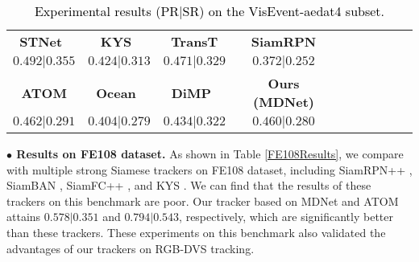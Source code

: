 \documentclass[journal]{IEEEtran}
\begin{document}
\begin{table}[!htp]
\center
\scriptsize      
\caption{\textcolor{black}{Experimental results (PR$|$SR) on the VisEvent-aedat4 subset.}} 
\label{VisEventaedat4Results} 
\begin{tabular}{cccccccccc} 	 
\hline \toprule [0.5 pt]  
\textbf{STNet}~\cite{zhang2022STNet} 
&\textbf{KYS}~\cite{Goutam2020KYS} 
&\textbf{TransT} \cite{chen2021TransT} 
&\textbf{SiamRPN} \cite{li2018siamRPN}  \\ 
 $0.492|0.355$      
&$0.424|0.313$     
&$0.471|0.329$     
&$0.372|0.252$     \\  
\hline 
\textbf{ATOM} \cite{danelljan2019atom} 	
&\textbf{Ocean}~\cite{zhang2020ocean}  
&\textbf{DiMP}~\cite{bhat2019DiMP}  
&\textbf{Ours (MDNet)} \\ 
\hline 
 $0.462|0.291$  
&$0.404|0.279$      
&$0.434|0.322$       
&$0.460|0.280$       	 \\ 
\hline \toprule [0.5 pt]
\end{tabular}
\end{table} 



\textbf{$\bullet$ Results on FE108 dataset.}
As shown in Table \ref{FE108Results}, we compare with multiple strong Siamese trackers on FE108 dataset, including SiamRPN++ \cite{li2018siamrpn++}, SiamBAN \cite{chen2020siamban}, SiamFC++ \cite{xu2020siamfc++}, and KYS \cite{Goutam2020KYS}. We can find that the results of these trackers on this benchmark are poor. Our tracker based on MDNet and ATOM attains $0.578|0.351$ and $0.794|0.543$, respectively, which are significantly better than these trackers. These experiments on this benchmark also validated the advantages of our trackers on RGB-DVS tracking. 
\end{document}
